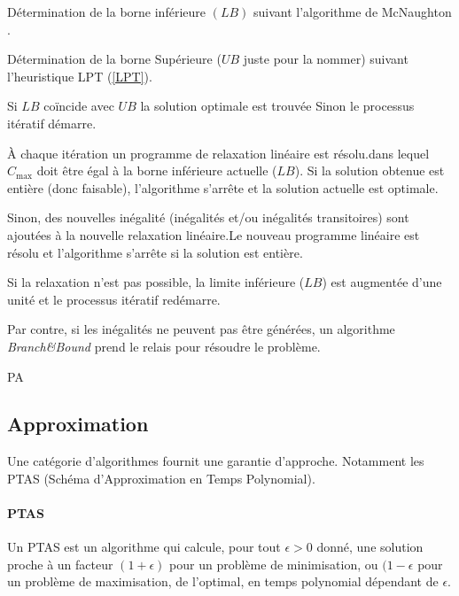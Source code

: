 \documentclass[a4paper,12pt]{report}
\theoremstyle{plain}				%
\theoremstyle{definition}				%
\begin{document}
\bigskip
\begin{algorithm}[H]
\DontPrintSemicolon

Détermination de la borne inférieure $(LB)$ suivant l'algorithme de
McNaughton \cite{mcnaughton1959scheduling}.

\BlankLine %
Détermination de la borne Supérieure ($UB$ juste pour la nommer)
suivant l'heuristique LPT (\ref{LPT}).

\BlankLine %
Si $LB$ coïncide avec $UB$ la solution optimale est trouvée Sinon le
processus itératif démarre.

\BlankLine
À chaque itération un programme de relaxation linéaire est résolu.dans
lequel $C_{\max}$ doit être égal à la borne inférieure actuelle
($LB$).
Si la solution obtenue est entière (donc faisable), l'algorithme
s'arrête et la solution actuelle est optimale.

\BlankLine
Sinon, des nouvelles inégalité (inégalités et/ou inégalités
transitoires) sont ajoutées à la nouvelle relaxation linéaire.Le
nouveau programme linéaire est résolu et l'algorithme s'arrête si la
solution est entière.

\BlankLine
Si la relaxation n'est pas possible, la limite inférieure ($LB$) est
augmentée d'une unité et le processus itératif redémarre.

\BlankLine
Par contre, si les inégalités ne peuvent pas être générées, un
algorithme \textit{Branch\&Bound} prend le relais pour résoudre le
problème.

\caption{PA\label{PA}}
\end{algorithm}


\subsection{Approximation}

Une catégorie d'algorithmes fournit une garantie d'approche.
Notamment les PTAS (Schéma d'Approximation en Temps Polynomial).

\paragraph{PTAS}

Un PTAS est un algorithme qui calcule, pour tout $\epsilon > 0$ donné,
une solution proche à un facteur $(1+\epsilon)$ pour un problème de
minimisation, ou $(1-\epsilon$ pour un problème de maximisation, de
l'optimal, en temps polynomial dépendant de $\epsilon$.
\end{document}
